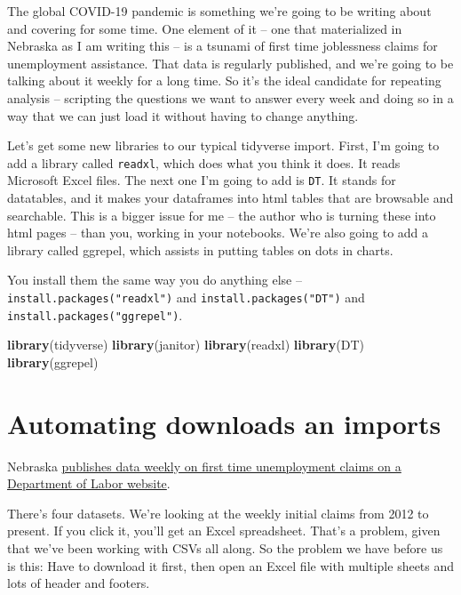 \documentclass[]{book}
\newenvironment{Shaded}{\begin{snugshade}}{\end{snugshade}}
\newcommand{\KeywordTok}[1]{\textcolor[rgb]{0.13,0.29,0.53}{\textbf{#1}}}
\newcommand{\NormalTok}[1]{#1}
\begin{document}
The global COVID-19 pandemic is something we're going to be writing about and covering for some time. One element of it -- one that materialized in Nebraska as I am writing this -- is a tsunami of first time joblessness claims for unemployment assistance. That data is regularly published, and we're going to be talking about it weekly for a long time. So it's the ideal candidate for repeating analysis -- scripting the questions we want to answer every week and doing so in a way that we can just load it without having to change anything.

Let's get some new libraries to our typical tidyverse import. First, I'm going to add a library called \texttt{readxl}, which does what you think it does. It reads Microsoft Excel files. The next one I'm going to add is \texttt{DT}. It stands for datatables, and it makes your dataframes into html tables that are browsable and searchable. This is a bigger issue for me -- the author who is turning these into html pages -- than you, working in your notebooks. We're also going to add a library called ggrepel, which assists in putting tables on dots in charts.

You install them the same way you do anything else -- \texttt{install.packages("readxl")} and \texttt{install.packages("DT")} and \texttt{install.packages("ggrepel")}.

\begin{Shaded}
\begin{Highlighting}[]
\KeywordTok{library}\NormalTok{(tidyverse)}
\KeywordTok{library}\NormalTok{(janitor)}
\KeywordTok{library}\NormalTok{(readxl)}
\KeywordTok{library}\NormalTok{(DT)}
\KeywordTok{library}\NormalTok{(ggrepel)}
\end{Highlighting}
\end{Shaded}

\hypertarget{automating-downloads-an-imports}{%
\section{Automating downloads an imports}\label{automating-downloads-an-imports}}

Nebraska \href{https://neworks.nebraska.gov/gsipub/index.asp?docid=710}{publishes data weekly on first time unemployment claims on a Department of Labor website}.

There's four datasets. We're looking at the weekly initial claims from 2012 to present. If you click it, you'll get an Excel spreadsheet. That's a problem, given that we've been working with CSVs all along. So the problem we have before us is this: Have to download it first, then open an Excel file with multiple sheets and lots of header and footers.
\end{document}
